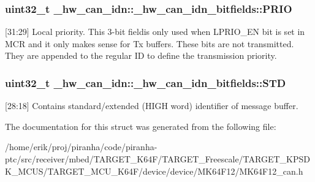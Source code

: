 \subsubsection[{\texorpdfstring{P\+R\+IO}{PRIO}}]{\setlength{\rightskip}{0pt plus 5cm}uint32\+\_\+t \+\_\+hw\+\_\+can\+\_\+idn\+::\+\_\+hw\+\_\+can\+\_\+idn\+\_\+bitfields\+::\+P\+R\+IO}\hypertarget{struct__hw__can__idn_1_1__hw__can__idn__bitfields_a6e38ea9c0282c7080cb681bdef48e4c3}{}\label{struct__hw__can__idn_1_1__hw__can__idn__bitfields_a6e38ea9c0282c7080cb681bdef48e4c3}
\mbox{[}31\+:29\mbox{]} Local priority. This 3-\/bit fieldis only used when L\+P\+R\+I\+O\+\_\+\+EN bit is set in M\+CR and it only makes sense for Tx buffers. These bits are not transmitted. They are appended to the regular ID to define the transmission priority. 
\subsubsection[{\texorpdfstring{S\+TD}{STD}}]{\setlength{\rightskip}{0pt plus 5cm}uint32\+\_\+t \+\_\+hw\+\_\+can\+\_\+idn\+::\+\_\+hw\+\_\+can\+\_\+idn\+\_\+bitfields\+::\+S\+TD}\hypertarget{struct__hw__can__idn_1_1__hw__can__idn__bitfields_ac2fdcabce14c724133528a033da25390}{}\label{struct__hw__can__idn_1_1__hw__can__idn__bitfields_ac2fdcabce14c724133528a033da25390}
\mbox{[}28\+:18\mbox{]} Contains standard/extended (H\+I\+GH word) identifier of message buffer. 

The documentation for this struct was generated from the following file\+:\begin{DoxyCompactItemize}
\item 
/home/erik/proj/piranha/code/piranha-\/ptc/src/receiver/mbed/\+T\+A\+R\+G\+E\+T\+\_\+\+K64\+F/\+T\+A\+R\+G\+E\+T\+\_\+\+Freescale/\+T\+A\+R\+G\+E\+T\+\_\+\+K\+P\+S\+D\+K\+\_\+\+M\+C\+U\+S/\+T\+A\+R\+G\+E\+T\+\_\+\+M\+C\+U\+\_\+\+K64\+F/device/device/\+M\+K64\+F12/M\+K64\+F12\+\_\+can.\+h\end{DoxyCompactItemize}
